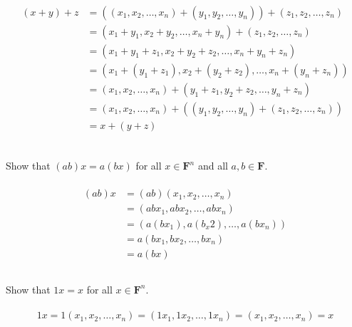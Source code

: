 \documentclass[a4paper]{article}
\begin{document}
\paragraph{}
\[
    \begin{aligned}
        (x+y)+z & = ((x_1,x_2,\ldots,x_n)+(y_1,y_2,\ldots,y_n))+(z_1,z_2,\ldots,z_n) \\
                & = (x_1+y_1,x_2+y_2,\ldots,x_n+y_n)+(z_1,z_2,\ldots,z_n)            \\
                & = (x_1+y_1+z_1,x_2+y_2+z_2,\ldots,x_n+y_n+z_n)                     \\
                & = (x_1+(y_1+z_1),x_2+(y_2+z_2),\ldots,x_n+(y_n+z_n))               \\
                & = (x_1,x_2,\ldots,x_n)+(y_1+z_1,y_2+z_2,\ldots,y_n+z_n)            \\
                & = (x_1,x_2,\ldots,x_n)+((y_1,y_2,\ldots,y_n)+(z_1,z_2,\ldots,z_n)) \\
                & = x+(y+z)                                                          \\
    \end{aligned}
\]

\subsection{}
Show that $(a b) x=a(b x)$ for all $x \in \mathbf{F}^{n}$ and all $a, b \in \mathbf{F}$.
\paragraph{}
\[
    \begin{aligned}
        (a b) x & = (ab)(x_1,x_2,\ldots,x_n)         \\
                & = (abx_1,abx_2,\ldots,abx_n)       \\
                & = (a(bx_1),a(b_x2),\ldots,a(bx_n)) \\
                & = a(bx_1,bx_2,\ldots,bx_n)         \\
                & = a(bx)
    \end{aligned}
\]

\subsection{}
Show that $1 x=x$ for all $x \in \mathbf{F}^{n}$.
\paragraph{}
\[
    1x = 1(x_1,x_2,\ldots,x_n) = (1x_1,1x_2,\ldots,1x_n) = (x_1,x_2,\ldots,x_n) =x
\]
\end{document}
